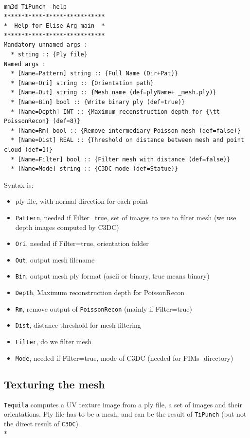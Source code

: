 \begin{verbatim}
mm3d TiPunch -help
*****************************
*  Help for Elise Arg main  *
*****************************
Mandatory unnamed args :
  * string :: {Ply file}
Named args :
  * [Name=Pattern] string :: {Full Name (Dir+Pat)}
  * [Name=Ori] string :: {Orientation path}
  * [Name=Out] string :: {Mesh name (def=plyName+ _mesh.ply)}
  * [Name=Bin] bool :: {Write binary ply (def=true)}
  * [Name=Depth] INT :: {Maximum reconstruction depth for {\tt PoissonRecon} (def=8)}
  * [Name=Rm] bool :: {Remove intermediary Poisson mesh (def=false)}
  * [Name=Dist] REAL :: {Threshold on distance between mesh and point cloud (def=1)}
  * [Name=Filter] bool :: {Filter mesh with distance (def=false)}
  * [Name=Mode] string :: {C3DC mode (def=Statue)}
\end{verbatim}

Syntax is:

\begin{itemize}
  \item ply file, with normal direction for each point
  \item {\tt Pattern}, needed if Filter=true, set of images to use to filter mesh (we use depth images computed by C3DC)
  \item {\tt Ori}, needed if Filter=true, orientation folder
  \item {\tt Out}, output mesh filename
  \item {\tt Bin}, output mesh ply format (ascii or binary, true means binary)
  \item {\tt Depth}, Maximum reconstruction depth for PoissonRecon
  \item {\tt Rm}, remove output of {\tt PoissonRecon} (mainly if Filter=true)
  \item {\tt Dist}, distance threshold for mesh filtering
  \item {\tt Filter}, do we filter mesh
  \item {\tt Mode}, needed if Filter=true, mode of C3DC (needed for PIMs- directory)
\end{itemize}

\subsection{Texturing the mesh}

{\tt Tequila} computes a UV texture image from a ply file, a set of images and their orientations. Ply file has to be a mesh, and can be the result of {\tt TiPunch} (but not the direct result of {\tt C3DC}).\\*

